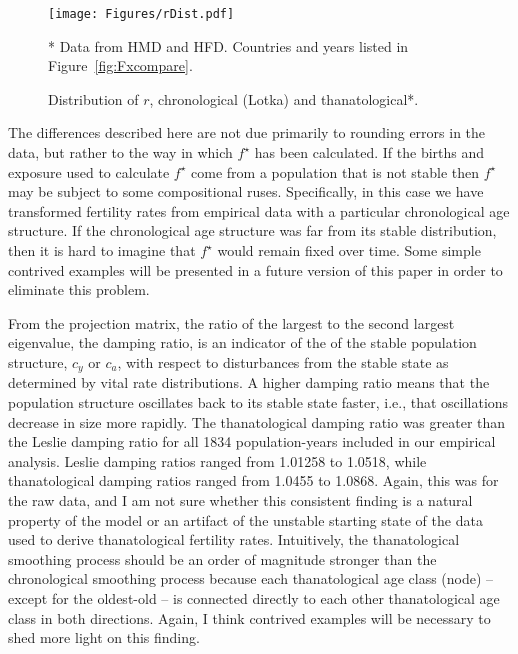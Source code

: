 \documentclass{article}
\begin{document}
\begin{figure}[h!]
	\caption{Distribution of $r$, chronological (Lotka) and thanatological*.}
	\begin{center}
		\label{fig:rDist}
		\texttt{[image: Figures/rDist.pdf]}
	\end{center}
	\begin{tiny}
     * Data from HMD and HFD. Countries and years listed in
     Figure~\ref{fig:Fxcompare}.
	\end{tiny}
\end{figure}

The differences described here are not due primarily to rounding errors in the
data, but rather to the way in which $f^\star$ has been calculated. If the
births and exposure used to calculate $f^\star$ come from a population that is not stable
then $f^\star$ may be subject to some compositional ruses. Specifically, in this
case we have transformed fertility rates from empirical data with a particular
chronological age structure. If the chronological age structure was far from its
stable distribution, then it is hard to imagine that $f^\star$ would remain
fixed over time. Some simple contrived examples will be presented in a future
version of this paper in order to eliminate this problem.

From the projection matrix, the ratio of the largest to the second largest
eigenvalue, the damping ratio, is an indicator of the  of the
stable population structure, $c_y$ or $c_a$, with respect to disturbances from the stable state
as determined by vital rate distributions. A higher damping ratio means that the
population structure oscillates back to its stable state faster, i.e., that
oscillations decrease in size more rapidly. The thanatological damping ratio was
greater than the Leslie damping ratio for all 1834 population-years included in
our empirical analysis. Leslie damping ratios ranged from 1.01258 to 1.0518,
while thanatological damping ratios ranged from 1.0455 to 1.0868. Again, this
was for the raw data, and I am not sure whether this consistent finding is a
natural property of the model or an artifact of the unstable starting state of
the data used to derive thanatological fertility rates. Intuitively, the
thanatological smoothing process should be an order of magnitude stronger than
the chronological smoothing process because each thanatological age class
(node) -- except for the oldest-old -- is connected directly to each other
thanatological age class in both directions. Again, I think contrived examples
will be necessary to shed more light on this finding.
\end{document}
